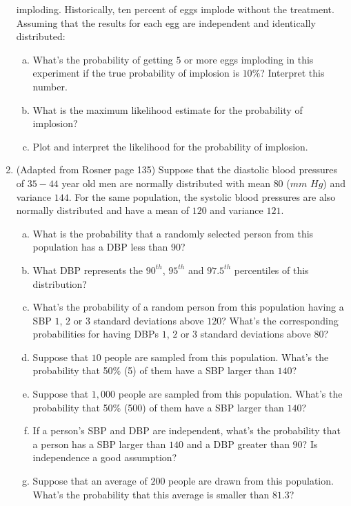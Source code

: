 \documentclass[12pt]{article}
\begin{document}
\begin{enumerate}[Problem 1.]
  imploding.  Historically, ten percent of eggs implode without the
  treatment. Assuming that the results for each egg are independent
  and identically distributed:
  \begin{enumerate}[a.]
  \item What's the probability of getting $5$ or more eggs imploding
    in this experiment if the true probability of implosion is $10\%$?
    Interpret this number.
  \item What is the maximum likelihood estimate for the probability of
    implosion?
  \item Plot and interpret the likelihood for the probability of implosion.
  \end{enumerate}

\item (Adapted from Rosner page 135) Suppose that the diastolic blood
  pressures of $35-44$ year old men are normally distributed with mean
  $80$ ($mm$ $Hg$) and variance $144$. For the same population, the
  systolic blood pressures are also normally distributed and have a
  mean of $120$ and variance $121$.
  \begin{enumerate}[a.]
  \item What is the probability that a randomly selected person from
    this population has a DBP less than 90?
  \item What DBP represents the $90^{th}$, $95^{th}$ and $97.5^{th}$
    percentiles of this distribution?
  \item What's the probability of a random person from this population
    having a SBP $1$, $2$ or $3$ standard deviations above $120$?
    What's the corresponding probabilities for having DBPs $1$, $2$ or
    $3$ standard deviations above $80$?
  \item Suppose that $10$ people are sampled from this population.  What's
    the probability that 50\% (5) of them have a SBP larger than $140$?
  \item Suppose that $1,000$ people are sampled from this population.  What's
    the probability that 50\% (500) of them have a SBP larger than $140$?
  \item If a person's SBP and DBP are independent, what's the
    probability that a person has a SBP larger than $140$ and a DBP
    greater than $90$? Is independence a good assumption?
  \item Suppose that an average of $200$ people are drawn from
    this population. What's the probability that this average
    is smaller than $81.3$?
  \end{enumerate}

\end{enumerate}
\end{document}
